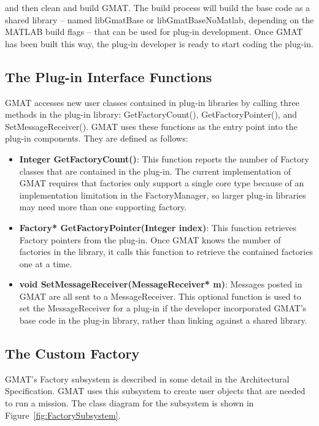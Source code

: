 \noindent and then clean and build GMAT.  The build process will build the
base code as a shared library -- named libGmatBase or libGmatBaseNoMatlab,
depending on the MATLAB build flags -- that can be used for plug-in
development. Once GMAT has been built this way, the plug-in developer is ready
to start coding the plug-in.

\subsection{The Plug-in Interface Functions}

GMAT accesses new user classes contained in plug-in libraries by calling three
methods in the plug-in library: GetFactoryCount(), GetFactoryPointer(), and
SetMessageReceiver(). GMAT uses these functions as the entry point into the
plug-in components.  They are defined as follows:

\begin{itemize}
\item \textbf{Integer GetFactoryCount()}:  This function reports the
number of Factory classes that are contained in the plug-in.  The current
implementation of GMAT requires that factories only support a single core type
because of an implementation limitation in the FactoryManager, so larger
plug-in libraries may need more than one supporting factory.
\item \textbf{Factory* GetFactoryPointer(Integer index)}:  This function
retrieves Factory pointers
from the plug-in.  Once GMAT knows the number of factories in the library, it
calls this function to retrieve the contained factories one at a time.
\item \textbf{void SetMessageReceiver(MessageReceiver* m)}: Messages posted
in GMAT are all sent to a MessageReceiver.  This optional function is used to
set the MessageReceiver for a plug-in if the developer incorporated GMAT's base
code in the plug-in library, rather than linking against a shared library.
\end{itemize}


\subsection{The Custom Factory}

GMAT's Factory subsystem is described in some detail in the Architectural
Specification\cite{ArchSpec}. GMAT uses this subsystem to create user objects
that are needed to run a mission.  The class diagram for the subsystem is shown
in Figure~\ref{fig:FactorySubsystem}.

